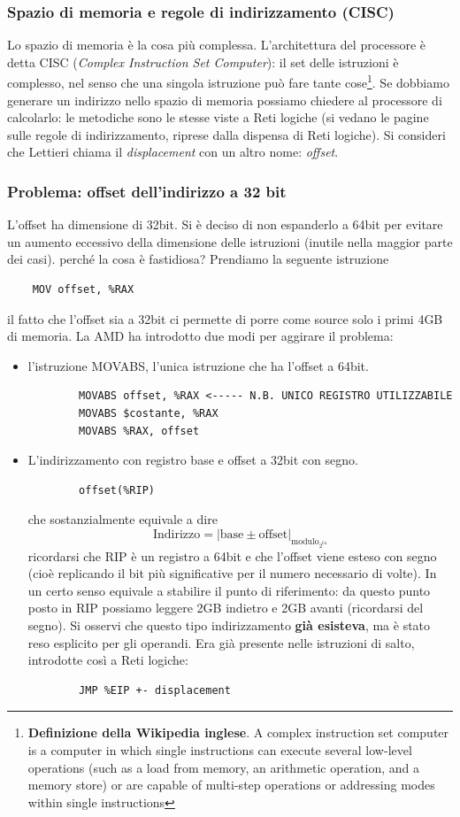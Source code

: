 \subsubsection{Spazio di memoria e regole di indirizzamento (CISC)}
Lo spazio di memoria è la cosa più complessa. L'architettura del processore è detta CISC (\emph{Complex Instruction Set Computer}): il set delle istruzioni è complesso, nel senso che una singola istruzione può fare tante cose\footnote{\textbf{Definizione della Wikipedia inglese}. A complex instruction set computer is a computer in which single instructions can execute several low-level operations (such as a load from memory, an arithmetic operation, and a memory store) or are capable of multi-step operations or addressing modes within single instructions}. Se dobbiamo generare un indirizzo nello spazio di memoria possiamo chiedere al processore di calcolarlo: le metodiche sono le stesse viste a Reti logiche (si vedano le pagine sulle regole di indirizzamento, riprese dalla dispensa di Reti logiche). Si consideri che Lettieri chiama il \emph{displacement} con un altro nome: \emph{offset}.

\subsubsection{Problema: offset dell'indirizzo a 32 bit} L'offset ha dimensione di 32bit. Si è deciso di non espanderlo a 64bit per evitare un aumento eccessivo della dimensione delle istruzioni (inutile nella maggior parte dei casi). perché la cosa è fastidiosa? Prendiamo la seguente istruzione
\begin{verbatim}
	MOV offset, %RAX
\end{verbatim}
il fatto che l'offset sia a 32bit ci permette di porre come source solo i primi 4GB di memoria. La AMD ha introdotto due modi per aggirare il problema:
\begin{itemize}
	\item l'istruzione MOVABS, l'unica istruzione che ha l'offset a 64bit.
	\begin{verbatim}
		MOVABS offset, %RAX <----- N.B. UNICO REGISTRO UTILIZZABILE
		MOVABS $costante, %RAX
		MOVABS %RAX, offset
	\end{verbatim}
	\item L'indirizzamento con registro base e offset a 32bit con segno.
	\begin{verbatim}
		offset(%RIP)
	\end{verbatim}
	che sostanzialmente equivale a dire 
	\[\text{Indirizzo}=\left|\text{base} \pm \text{offset}\right|_{\text{modulo}_{2^{64}}}\]
	ricordarsi che RIP è un registro a 64bit e che l'offset viene esteso con segno (cioè replicando il bit più significative per il numero necessario di volte). In un certo senso equivale a stabilire il punto di riferimento: da questo punto posto in RIP possiamo leggere 2GB indietro e 2GB avanti (ricordarsi del segno). Si osservi che questo tipo indirizzamento \textbf{già esisteva}, ma è stato reso esplicito per gli operandi. Era già presente nelle istruzioni di salto, introdotte così a Reti logiche:
	\begin{verbatim}
		JMP %EIP +- displacement
	\end{verbatim}
\end{itemize}
